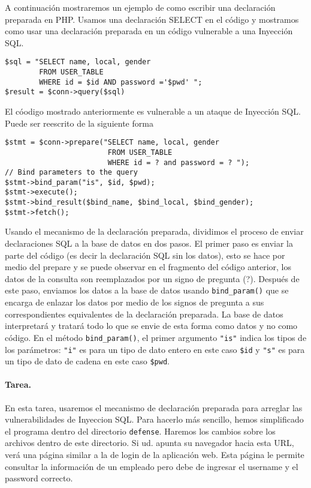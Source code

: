 A continuación mostraremos un ejemplo de como escribir una declaración preparada en PHP. Usamos una declaración SELECT en el código y mostramos como usar una declaración preparada en un código vulnerable a una Inyección SQL.


\begin{lstlisting}
$sql = "SELECT name, local, gender  
        FROM USER_TABLE 
        WHERE id = $id AND password ='$pwd' ";
$result = $conn->query($sql)
\end{lstlisting}

El cóodigo mostrado anteriormente es vulnerable a un ataque de Inyección SQL.
Puede ser reescrito de la siguiente forma


\begin{lstlisting}
$stmt = $conn->prepare("SELECT name, local, gender
                        FROM USER_TABLE 
                        WHERE id = ? and password = ? ");
// Bind parameters to the query
$stmt->bind_param("is", $id, $pwd);
$stmt->execute();
$stmt->bind_result($bind_name, $bind_local, $bind_gender);
$stmt->fetch();
\end{lstlisting}

Usando el mecanismo de la declaración preparada, dividimos el proceso de enviar declaraciones SQL a la base de datos en dos pasos.
El primer paso es enviar la parte del código (es decir la declaración SQL sin los datos), esto se hace por medio del prepare y se puede observar en el fragmento del código anterior, los datos de la consulta son reemplazados por un signo de pregunta (?). Después de este paso, enviamos los datos a la base de datos usando {\tt bind\_param()} que se encarga de enlazar los datos por medio de los signos de pregunta a sus correspondientes equivalentes de la declaración preparada.
La base de datos interpretará y tratará todo lo que se envie de esta forma como datos y no como código. 
En el método {\tt bind\_param()}, el primer argumento {\tt "is"} indica los tipos de los parámetros: \texttt{"i"} es para un tipo de dato entero en este caso {\tt \$id} y \texttt{"s"} es para un tipo de dato de cadena en este caso {\tt \$pwd}.

\paragraph{Tarea.} En esta tarea, usaremos el mecanismo de declaración preparada para arreglar las vulnerabilidades de Inyeccion SQL. Para hacerlo más sencillo, hemos simplificado el programa dentro del directorio \texttt{defense}. Haremos los cambios sobre los archivos dentro de este directorio.
Si ud. apunta su navegador hacia esta URL, verá una página similar a la de login de la aplicación web. Esta página le permite consultar la información de un empleado pero debe de ingresar el username y el password correcto.


